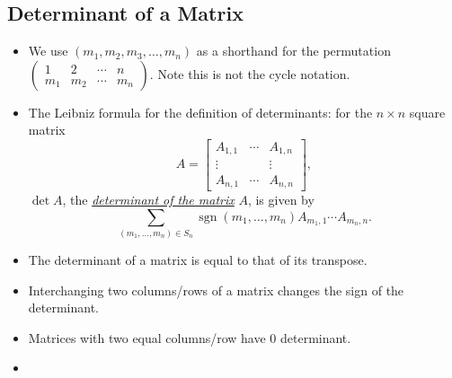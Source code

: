 \documentclass{article}
\newcommand{\df}[1]{\ul{\textit{#1}}}
\newcommand{\sgn}{\operatorname{sgn}}
\begin{document}
\subsection{Determinant of a Matrix}
\begin{itemize}
    \item We use $(m_1,m_2,m_3,\dots,m_n)$ as a shorthand for the permutation $\begin{pmatrix} 1 & 2 & \cdots & n \\ m_1 & m_2 & \cdots & m_n \end{pmatrix}$. Note this is not the cycle notation.
    
    
    
    
    \item The Leibniz formula for the definition of determinants: for the $n \times n$ square matrix \[A = \begin{bmatrix}
        A_{1,1} & \cdots & A_{1,n} \\ \vdots & & \vdots \\ A_{n,1} & \cdots & A_{n,n}
    \end{bmatrix},\] $\det A$, the \df{determinant of the matrix} $A$, is given by \[\sum_{(m_1,\dots,m_n) \in S_n} \sgn (m_1,\dots,m_n) A_{m_1,1} \cdots A_{m_n,n}.\]
    \item The determinant of a matrix is equal to that of its transpose.
    \item Interchanging two columns/rows of a matrix changes the sign of the determinant.
    \item Matrices with two equal columns/row have 0 determinant.
    \item 
    
\end{itemize}
    


\setcounter{secnumdepth}{3}
\end{document}
